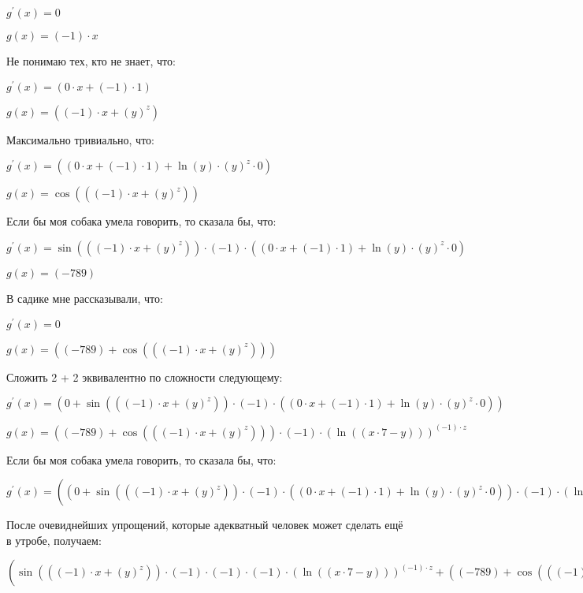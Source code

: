 \documentclass[a4paper,12pt]{article}
\begin{document}
\begin{flushleft}
$g^{'}(x) = 0$

$g(x) = (-1) \cdot x$

Не понимаю тех, кто не знает, что:

$g^{'}(x) = (0 \cdot x+(-1) \cdot 1)$

$g(x) = ((-1) \cdot x+(y)^{z})$

Максимально тривиально, что:

$g^{'}(x) = ((0 \cdot x+(-1) \cdot 1)+\ln {(y)} \cdot (y)^{z} \cdot 0)$

$g(x) = \cos {(((-1) \cdot x+(y)^{z}))}$

Если бы моя собака умела говорить, то сказала бы, что:

$g^{'}(x) = \sin {(((-1) \cdot x+(y)^{z}))} \cdot (-1) \cdot ((0 \cdot x+(-1) \cdot 1)+\ln {(y)} \cdot (y)^{z} \cdot 0)$

$g(x) = (-789)$

В садике мне рассказывали, что:

$g^{'}(x) = 0$

$g(x) = ((-789)+\cos {(((-1) \cdot x+(y)^{z}))})$

Сложить 2 + 2 эквивалентно по сложности следующему:

$g^{'}(x) = (0+\sin {(((-1) \cdot x+(y)^{z}))} \cdot (-1) \cdot ((0 \cdot x+(-1) \cdot 1)+\ln {(y)} \cdot (y)^{z} \cdot 0))$

$g(x) = ((-789)+\cos {(((-1) \cdot x+(y)^{z}))}) \cdot (-1) \cdot (\ln {((x \cdot 7-y))})^{(-1) \cdot z}$

Если бы моя собака умела говорить, то сказала бы, что:

$g^{'}(x) = ((0+\sin {(((-1) \cdot x+(y)^{z}))} \cdot (-1) \cdot ((0 \cdot x+(-1) \cdot 1)+\ln {(y)} \cdot (y)^{z} \cdot 0)) \cdot (-1) \cdot (\ln {((x \cdot 7-y))})^{(-1) \cdot z}+((-789)+\cos {(((-1) \cdot x+(y)^{z}))}) \cdot (0 \cdot (\ln {((x \cdot 7-y))})^{(-1) \cdot z}+(-1) \cdot (\ln {((x \cdot 7-y))})^{(-1) \cdot z} \cdot ((0 \cdot z+(-1) \cdot 0) \cdot \ln {(\ln {((x \cdot 7-y))})}+(-1) \cdot z \cdot  \dfrac{1}{\ln {((x \cdot 7-y))}}  \cdot  \dfrac{1}{(x \cdot 7-y)}  \cdot ((1 \cdot 7+x \cdot 0)-0))))$

После очевиднейших упрощений, которые адекватный человек может сделать ещё в утробе, получаем:

$(\sin {(((-1) \cdot x+(y)^{z}))} \cdot (-1) \cdot (-1) \cdot (-1) \cdot (\ln {((x \cdot 7-y))})^{(-1) \cdot z}+((-789)+\cos {(((-1) \cdot x+(y)^{z}))}) \cdot (-1) \cdot (\ln {((x \cdot 7-y))})^{(-1) \cdot z} \cdot (-1) \cdot z \cdot  \dfrac{1}{\ln {((x \cdot 7-y))}}  \cdot  \dfrac{1}{(x \cdot 7-y)}  \cdot 7)$


\end{flushleft}
\end{document}

